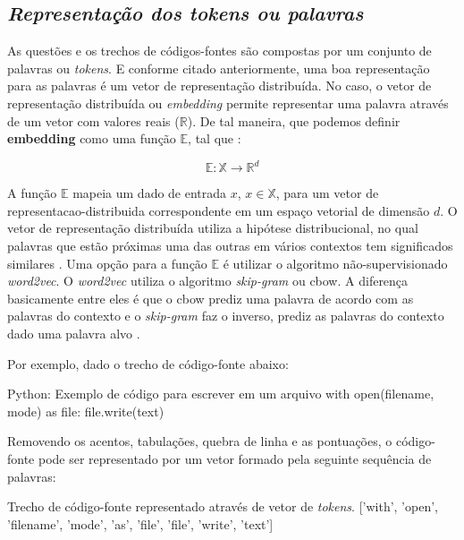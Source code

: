 \subsection{\textit{Representação dos \textit{tokens} ou palavras}}

As questões e os trechos de códigos-fontes são compostas por um conjunto de palavras ou \textit{tokens}. E conforme citado anteriormente, uma boa representação para as palavras é um vetor de representação distribuída. No caso, o vetor de representação distribuída ou \textit{embedding} permite representar uma palavra através de um vetor com valores reais ($\mathbb{R}$). De tal maneira, que podemos definir \textbf{embedding} como uma função $\mathbb{E}$, tal que \citep{cambronero-deep-learning-code-search:2019}:

\begin{equation}
    \mathbb{E}: \mathbb{X} \rightarrow \mathbb{R}^{d}
\end{equation}

A função $\mathbb{E}$ mapeia um dado de entrada $x$, $x \in \mathbb{X}$, para um vetor de \gls{representacao-distribuida} correspondente em um espaço vetorial de dimensão $d$. O vetor de representação distribuída utiliza a hipótese distribucional, no qual palavras que estão próximas uma das outras em vários contextos tem significados similares \citep{Goodfellow-et-al-2016:representation-learning}. Uma opção para a função $\mathbb{E}$ é utilizar o algoritmo não-supervisionado \textit{word2vec}. O \textit{word2vec} utiliza o algoritmo \textit{skip-gram} ou \acrshort{cbow}. A diferença basicamente entre eles é que o \acrshort{cbow} prediz uma palavra de acordo com as palavras do contexto e o \textit{skip-gram} faz o inverso, prediz as palavras do contexto dado uma palavra alvo \citep{mikolov2013distributed}.

Por exemplo, dado o trecho de código-fonte abaixo:

\begin{mypython}{Python: Exemplo de código para escrever em um arquivo}
with open(filename, mode) as file:
    file.write(text)
\end{mypython}

Removendo os acentos, tabulações, quebra de linha e as pontuações, o código-fonte pode ser representado por um vetor formado pela seguinte sequência de palavras:

\begin{mypythonembedding}{Trecho de código-fonte representado através de vetor de \textit{tokens}.}
  ['with', 'open', 'filename', 'mode', 'as', 'file', 'file', 'write', 'text']
\end{mypythonembedding}

